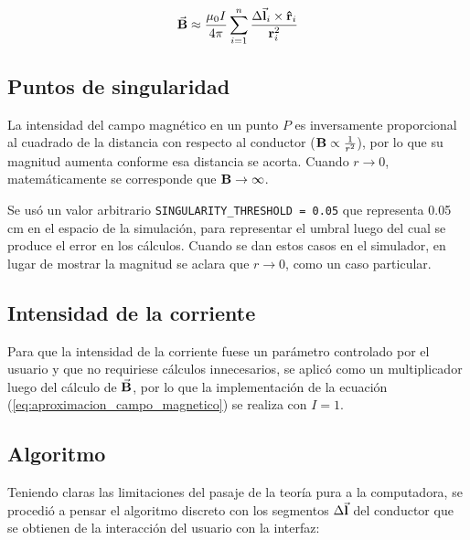 \documentclass[12pt,a4paper]{article}
\begin{document}
\begin{equation}\label{eq:aproximacion_campo_magnetico}
    \va{B} \approx \frac{\mu_0 I}{4 \pi} \sum_{i=1}^{n} \frac{\Delta \va{l}_i \times \vu{r}_i}{\vb{r}^{2}_{i}}
\end{equation}

\subsection{Puntos de singularidad}
La intensidad del campo magnético en un punto $P$ es inversamente proporcional al cuadrado de la distancia con respecto al conductor ($\vb{B} \propto \frac{1}{r^2}$), por lo que su magnitud aumenta conforme esa distancia se acorta. Cuando $r \to 0$, matemáticamente se corresponde que $\vb{B} \to \infty$.

Se usó un valor arbitrario \verb|SINGULARITY_THRESHOLD = 0.05| que representa 0.05 \si{cm} en el espacio de la simulación, para representar el umbral luego del cual se produce el error en los cálculos.
Cuando se dan estos casos en el simulador, en lugar de mostrar la magnitud se aclara que $r \to 0$, como un caso particular.

\subsection{Intensidad de la corriente}
Para que la intensidad de la corriente fuese un parámetro controlado por el usuario y que no requiriese cálculos innecesarios, se aplicó como un multiplicador luego del cálculo de $\va{B}$, por lo que la implementación de la ecuación (\ref{eq:aproximacion_campo_magnetico}) se realiza con $I=1$.

\subsection{Algoritmo}
Teniendo claras las limitaciones del pasaje de la teoría pura a la computadora, se procedió a pensar el algoritmo discreto con los segmentos $\Delta\va{l}$ del conductor que se obtienen de la interacción del usuario con la interfaz:
\end{document}
